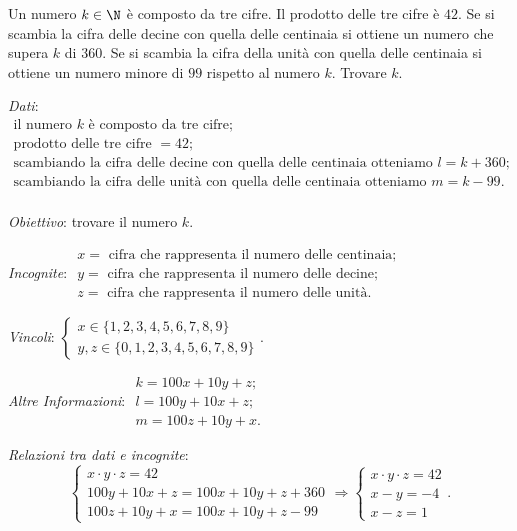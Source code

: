 \begin{problema}{}{}
Un numero \(k\in \N\) è composto da tre cifre. Il prodotto delle tre cifre è 
\(42\). Se si scambia la cifra delle decine con quella delle centinaia si 
ottiene un numero che supera \(k\) di \(360\). Se si scambia la cifra della 
unità con quella delle centinaia si ottiene un numero minore di \(99\) 
rispetto al numero \(k\). Trovare \(k\).
\end{problema}

\emph{Dati}: \(\begin{array}{l}
\text{il numero } k \text{ è composto da tre cifre};\\
\text{prodotto delle tre cifre } = 42;\\
\text{scambiando la cifra delle decine con quella delle centinaia otteniamo }l=k+360; \\
\text{scambiando la cifra delle unità con quella delle centinaia otteniamo } m=k-99.\\
\end{array}\)

\emph{Obiettivo}: trovare il numero \(k\).

\emph{Incognite}: \(\begin{array}{l}
x =\text{ cifra che rappresenta il numero delle centinaia;}\\
y=\text{ cifra che rappresenta il numero delle decine;}\\
z=\text{ cifra che rappresenta il numero delle unità.}
\end{array}\)

\emph{Vincoli}: \(\left\{\begin{array}{l}x\in \{1,2,3,4,5,6,7,8,9\} \\y,z\in \{0,1,2,3,4,5,6,7,8,9\}\end{array}\right.\).

\emph{Altre Informazioni}: \(\begin{array}{l}
k=100x+10y+z;\\
l=100y+10x+z;\\
m=100z+10y+x.
\end{array}\)

\emph{Relazioni tra dati e incognite}: \[ \left\{\begin{array}{l}x\cdot y\cdot z=42 \\100y+10x+z=100x+10y+z+360\\100z+10y+x=100x+10y+z-99 \end{array}\right.\Rightarrow \left\{\begin{array}{l}x\cdot y\cdot z=42 \\x-y=-4\\x-z=1\end{array}\right.. \]

